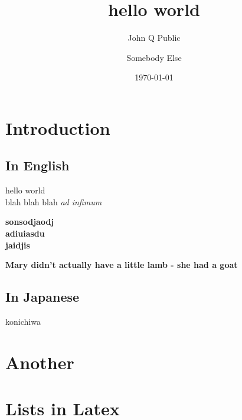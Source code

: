 \documentclass{article}[18pt]
\title{hello world}
\author{John Q Public \and Somebody Else }
\date{\today}
\begin{document}
\maketitle

\section{Introduction}

    

    \subsection{In English}
        hello world \\
        blah blah blah \emph{ad infimum}
        
        
        {
            
            \bf
            sonsodjaodj
            \\
            adiuiasdu
            \\
            jaidjis
            
        }
        
        \textbf{Mary didn't actually have a little lamb - she had a goat}
        
    \subsection{In Japanese}
        konichiwa
        
        

\section{Another }



\section{Lists in Latex}
\end{document}
